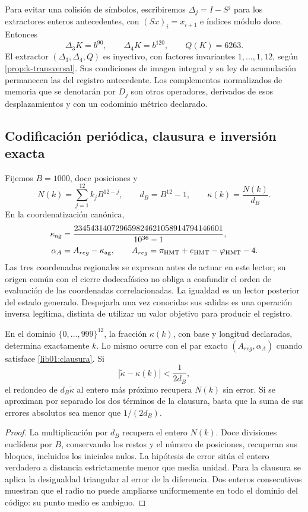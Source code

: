 Para evitar una colisión de símbolos, escribiremos
\(\Delta_j=I-S^j\) para los extractores enteros antecedentes, con
\((Sx)_i=x_{i+1}\) e índices módulo doce. Entonces
\[
 \Delta_3K=b^{90},\qquad \Delta_4K=b^{120},\qquad Q(K)=6263.
\]
El extractor \((\Delta_3,\Delta_4,Q)\) es inyectivo, con factores
invariantes \(1,\ldots,1,12\), según \cref{prop:k-transversal}. Sus
condiciones de imagen integral y su ley de acumulación permanecen las del
registro antecedente. Los complementos normalizados de memoria que se
denotarán por \(D_j\) son otros operadores, derivados de esos
desplazamientos y con un codominio métrico declarado.

\subsection{Codificación periódica, clausura e inversión exacta}
\label{lib01:kappa}

Fijemos \(B=1000\), doce posiciones y
\[
 N(k)=\sum_{j=1}^{12}k_jB^{12-j},\qquad d_B=B^{12}-1,
 \qquad \kappa(k)=\frac{N(k)}{d_B}.
\]
En la coordenatización canónica,
\begin{equation}
 \begin{aligned}
 \kappa_{\rm ag}
 &=\frac{234543140729659824621058914794146601}{10^{36}-1},\\
 \alpha_A&=A_{reg}-\kappa_{\rm ag},\qquad
 A_{reg}=\pi_{\rm HMT}+e_{\rm HMT}-\varphi_{\rm HMT}-4.
 \end{aligned}
 \label{lib01:clausura}
\end{equation}
Las tres coordenadas regionales se expresan antes de actuar en este lector;
su origen común con el cierre dodecafásico no obliga a confundir el orden de
evaluación de las coordenadas correlacionadas. La igualdad es un lector
posterior del estado generado. Despejarla una vez conocidas sus salidas es
una operación inversa legítima, distinta de utilizar un valor objetivo para
producir el registro.

\begin{proposition}
\label{lib01:inversion-kappa}
En el dominio \(\{0,\ldots,999\}^{12}\), la fracción \(\kappa(k)\),
con base y longitud declaradas, determina exactamente \(k\). Lo mismo
ocurre con el par exacto \((A_{reg},\alpha_A)\) cuando satisface
\eqref{lib01:clausura}. Si
\[
 |\widetilde\kappa-\kappa(k)|<\frac1{2d_B},
\]
el redondeo de \(d_B\widetilde\kappa\) al entero más próximo recupera
\(N(k)\) sin error. Si se aproximan por separado los dos términos de la
clausura, basta que la suma de sus errores absolutos sea menor que
\(1/(2d_B)\).
\end{proposition}
\begin{proof}
La multiplicación por \(d_B\) recupera el entero \(N(k)\).
Doce divisiones euclídeas por \(B\), conservando los restos y el número
de posiciones, recuperan sus bloques, incluidos los iniciales nulos. La
hipótesis de error sitúa el entero verdadero a distancia estrictamente
menor que media unidad. Para la clausura se aplica la desigualdad
triangular al error de la diferencia. Dos enteros consecutivos muestran
que el radio no puede ampliarse uniformemente en todo el dominio del
código: su punto medio es ambiguo.
\end{proof}

